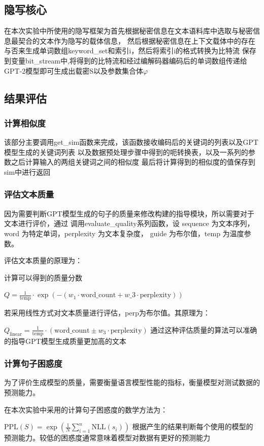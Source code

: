 \documentclass[a4paper,11pt,UTF8]{ctexart}
\begin{document}
    \subsection{隐写核心}
      在本次实验中所使用的隐写框架为首先根据秘密信息在文本语料库中选取与秘密信息最契合的文本作为隐写的载体信息，
      然后根据秘密信息在上下文载体中的存在与否来生成单词数组keyword\_set和索引i，然后将索引i的格式转换为比特流
      保存到变量bit\_stream中,将得到的比特流和经过编解码器编码后的单词数组传递给GPT-2模型即可生成出载密S以及参数集合体$\varphi $
      
    \subsection{结果评估}

      \subsubsection{计算相似度}
        该部分主要调用get\_sim函数来完成，该函数接收编码后的关键词的列表以及GPT模型生成的关键词列表
        以及数据预处理步骤中得到的呃转换表，以及一系列的参数之后计算输入的两组关键词之间的相似度
        最后将计算得到的相似度的值保存到sim中进行返回

      \subsubsection{评估文本质量}
        因为需要判断GPT模型生成的句子的质量来修改构建的指导模块，所以需要对于文本进行评价，通过
        调用evaluate\_quality系列函数，设 sequence 为文本序列，word 为特定单词，perplexity 为文本复杂度，
        guide 为布尔值，temp 为温度参数。\par
        评估文本质量的原理为：\par
        
        计算可以得到的质量分数\par
        $ Q = \frac{1}{\text{temp}} \cdot \exp ( - (w_1 \cdot \text{word\_count} + w\_3 \cdot \text{perplexity} ) ) $\par
        若采用线性方式对文本质量进行评估，perp为布尔值。其原理为：\par
        $Q_{\text{linear}} = \frac{1}{\text{temp}} \cdot \left( \text{word\_count} \pm w_3 \cdot \text{perplexity} \right)$
        通过这种评估质量的算法可以准确的指导GPT模型生成质量更加高的文本

      \subsubsection{计算句子困惑度}
        为了评价生成模型的质量，需要衡量语言模型性能的指标，衡量模型对测试数据的预测能力。\par
        在本次实验中采用的计算句子困惑度的数学方法为：\par
        $\text{PPL}(S) = \exp\left( \frac{1}{N} \sum_{i=1}^{n} \text{NLL}(s_i) \right)$
        根据产生的结果判断每个使用的模型的预测能力。较低的困惑度通常意味着模型对数据有更好的预测能力
\end{document}
